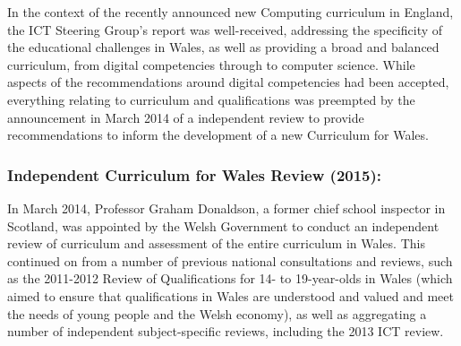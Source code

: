 \documentclass{llncs}
\begin{document}

In the context of the recently announced new Computing curriculum in
England, the ICT Steering Group's report was well-received, addressing
the specificity of the educational challenges in Wales, as well as
providing a broad and balanced curriculum, from digital competencies
through to computer science. While aspects
of the recommendations around digital competencies had been accepted,
everything relating to curriculum and qualifications was preempted by
the announcement in March 2014 of a independent review to provide
recommendations to inform the development of a new Curriculum for
Wales.



\subsubsection*{Independent Curriculum for Wales Review (2015):}

In March 2014, Professor Graham Donaldson, a former chief school
inspector in Scotland, was appointed by the Welsh Government to
conduct an independent review of curriculum and assessment 
of the entire curriculum in Wales. This continued on from a number of
previous national consultations and reviews, such as the 2011-2012
Review of Qualifications for 14- to 19-year-olds in Wales (which aimed
to ensure that qualifications in Wales are understood and valued and
meet the needs of young people and the Welsh economy), as well as
aggregating a number of independent subject-specific reviews,
including the 2013 ICT review.
\end{document}

